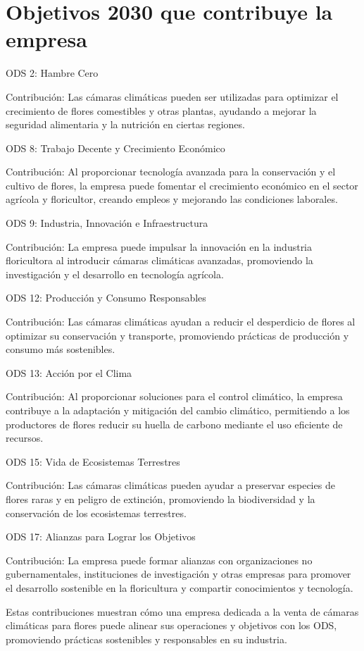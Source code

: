 \section{Objetivos 2030 que contribuye la empresa}

ODS 2: Hambre Cero

Contribución: Las cámaras climáticas pueden ser utilizadas para optimizar el crecimiento de flores comestibles y otras plantas, ayudando a mejorar la seguridad alimentaria y la nutrición en ciertas regiones.


ODS 8: Trabajo Decente y Crecimiento Económico

Contribución: Al proporcionar tecnología avanzada para la conservación y el cultivo de flores, la empresa puede fomentar el crecimiento económico en el sector agrícola y floricultor, creando empleos y mejorando las condiciones laborales.


ODS 9: Industria, Innovación e Infraestructura

Contribución: La empresa puede impulsar la innovación en la industria floricultora al introducir cámaras climáticas avanzadas, promoviendo la investigación y el desarrollo en tecnología agrícola.


ODS 12: Producción y Consumo Responsables

Contribución: Las cámaras climáticas ayudan a reducir el desperdicio de flores al optimizar su conservación y transporte, promoviendo prácticas de producción y consumo más sostenibles.


ODS 13: Acción por el Clima

Contribución: Al proporcionar soluciones para el control climático, la empresa contribuye a la adaptación y mitigación del cambio climático, permitiendo a los productores de flores reducir su huella de carbono mediante el uso eficiente de recursos.


ODS 15: Vida de Ecosistemas Terrestres

Contribución: Las cámaras climáticas pueden ayudar a preservar especies de flores raras y en peligro de extinción, promoviendo la biodiversidad y la conservación de los ecosistemas terrestres.


ODS 17: Alianzas para Lograr los Objetivos


Contribución: La empresa puede formar alianzas con organizaciones no gubernamentales, instituciones de investigación y otras empresas para promover el desarrollo sostenible en la floricultura y compartir conocimientos y tecnología.

Estas contribuciones muestran cómo una empresa dedicada a la venta de cámaras climáticas para flores puede alinear sus operaciones y objetivos con los ODS, promoviendo prácticas sostenibles y responsables en su industria.

